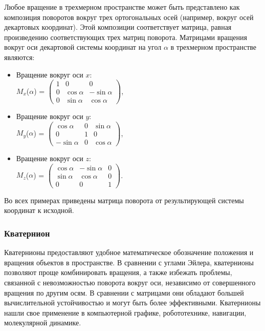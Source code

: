 Любое вращение в трехмерном пространстве может быть представлено как композиция поворотов вокруг
трех ортогональных осей (например, вокруг осей декартовых координат).
Этой композиции соответствует матрица, равная произведению соответствующих трех матриц поворота.
Матрицами вращения вокруг оси декартовой системы координат на угол $\alpha$ в трехмерном пространстве являются:
\begin{itemize}
  \item Вращение вокруг оси $x$:
  \\
  $M_x$($\alpha$) = 
  $\begin{pmatrix} 
    1 & 0          & 0           \\
    0 & \cos\alpha & -\sin\alpha \\
    0 & \sin\alpha & \cos\alpha
  \end{pmatrix}$,
  
  \item Вращение вокруг оси $y$:
  \\
  $M_y$($\alpha$) = 
  $\begin{pmatrix} 
    \cos\alpha  & 0 & \sin\alpha \\
     0          & 1 & 0           \\
    -\sin\alpha & 0 & \cos\alpha
  \end{pmatrix}$,
  
  \item Вращение вокруг оси $z$:
  \\
  $M_z$($\alpha$) =
  $\begin{pmatrix} 
    \cos\alpha & -\sin\alpha & 0 \\
    \sin\alpha & \cos\alpha  & 0 \\
    0          & 0           & 1
  \end{pmatrix}$.
\end{itemize}

Во всех примерах приведены матрица поворота от результирующей системы координат к исходной.
  

\subsubsection{Кватернион}
Кватернионы предоставляют удобное математическое обозначение положения и вращения объектов в пространстве.
В сравнении с углами Эйлера, кватернионы позволяют проще комбинировать вращения, а также избежать проблемы,
связанной с невозможностью поворота вокруг оси, независимо от совершенного вращения по другим осям.
В сравнении с матрицами они обладают большей вычислительной устойчивостью и могут быть более эффективными.
Кватернионы нашли свое применение в компьютерной графике, робототехнике, навигации, молекулярной динамике.

